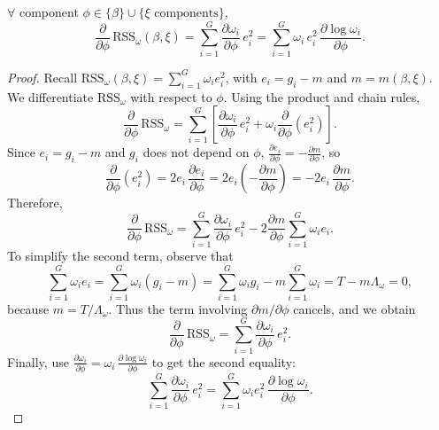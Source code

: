 \begin{lemma}
\label{lem:rss-deriv}
$\forall$ component \(\phi\in\{\beta\}\cup\{\xi\text{ components}\}\),
\begin{equation}
\label{eq:rss-deriv}
\frac{\partial}{\partial \phi}\,\mathrm{RSS}_\omega(\beta,\xi)
=\sum_{i=1}^G \frac{\partial \omega_i}{\partial \phi}\,e_i^2
=\sum_{i=1}^G \omega_i\,e_i^2\,\frac{\partial \log \omega_i}{\partial \phi}.
\end{equation}
\end{lemma}
\begin{proof}
Recall
\(\mathrm{RSS}_\omega(\beta,\xi)=\sum_{i=1}^G \omega_i e_i^2\),
with \(e_i=g_i-m\) and \(m=m(\beta,\xi)\).
We differentiate \(\mathrm{RSS}_\omega\) with respect to \(\phi\).
Using the product and chain rules,
\[
\frac{\partial}{\partial\phi}\,\mathrm{RSS}_\omega
=\sum_{i=1}^G \left[
\frac{\partial \omega_i}{\partial\phi}\,e_i^2
+\omega_i \frac{\partial}{\partial\phi}(e_i^2)
\right].
\]
Since \(e_i=g_i-m\) and \(g_i\) does not depend on \(\phi\),
\(\frac{\partial e_i}{\partial\phi}=-\frac{\partial m}{\partial\phi}\), so
\[
\frac{\partial}{\partial\phi}(e_i^2)
=2e_i\,\frac{\partial e_i}{\partial\phi}
=2e_i\left(-\frac{\partial m}{\partial\phi}\right)
=-2e_i\,\frac{\partial m}{\partial\phi}.
\]
Therefore,
\[
\frac{\partial}{\partial\phi}\,\mathrm{RSS}_\omega
=\sum_{i=1}^G \frac{\partial \omega_i}{\partial\phi}\,e_i^2
-2\frac{\partial m}{\partial\phi}\sum_{i=1}^G \omega_i e_i.
\]
To simplify the second term, observe that
\[
\sum_{i=1}^G \omega_i e_i
=\sum_{i=1}^G \omega_i(g_i-m)
=\sum_{i=1}^G \omega_i g_i - m\sum_{i=1}^G \omega_i
=T - m\Lambda_\omega
=0,
\]
because \(m=T/\Lambda_\omega\).
Thus the term involving \(\partial m/\partial\phi\) cancels, and we obtain
\[
\frac{\partial}{\partial\phi}\,\mathrm{RSS}_\omega
=\sum_{i=1}^G \frac{\partial \omega_i}{\partial\phi}\,e_i^2.
\]
Finally, use \(\frac{\partial \omega_i}{\partial\phi}=\omega_i\,\frac{\partial \log \omega_i}{\partial\phi}\) to get the second equality:
\[
\sum_{i=1}^G \frac{\partial \omega_i}{\partial\phi}\,e_i^2
=\sum_{i=1}^G \omega_i e_i^2\,\frac{\partial \log \omega_i}{\partial\phi}.
\]
\end{proof}

